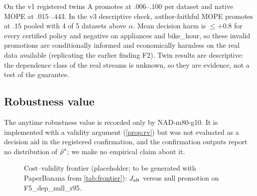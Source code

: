 On the v1 registered twins A promotes at $.006$--$.100$ per dataset and native MOPE at $.015$--$.443$.
In the v3 descriptive check, author-faithful MOPE promotes at $.15$ pooled with 4 of 5 datasets above
$\alpha$. Mean decision harm is $\le+0.8$ for every certified policy and negative on appliances and
bike\_hour, so these invalid promotions are conditionally informed and economically harmless on the
real data available (replicating the earlier finding F2). Twin results are descriptive: the dependence
class of the real streams is unknown, so they are evidence, not a test of the guarantee.

\subsection{Robustness value}

The anytime robustness value is recorded only by NAD-m80-g10. It is implemented with a validity
argument (\cref{prop:rv}) but was not evaluated as a decision aid in the registered confirmation, and
the confirmation outputs report no distribution of $\bar\rho^*$; we make no empirical claim about it.

\begin{figure}[t]
\centering
{}
\caption{Cost--validity frontier (placeholder; to be generated with PaperBanana from \cref{tab:frontier}): $J_{\rm alt}$ versus null promotion on F5\_dep\_null\_r95.}\label{fig:frontier}
\end{figure}
